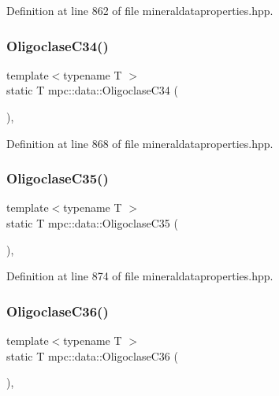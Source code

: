 Definition at line 862 of file mineraldataproperties.\+hpp.

\mbox{\label{namespacempc_1_1data_a425521c883ad46c92e6796d1252e7901}} 
\subsubsection{\texorpdfstring{Oligoclase\+C34()}{OligoclaseC34()}}
{\footnotesize\ttfamily template$<$typename T $>$ \\
static T mpc\+::data\+::\+Oligoclase\+C34 (\begin{DoxyParamCaption}{ }\end{DoxyParamCaption})\hspace{0.3cm}{\ttfamily [inline]}, {\ttfamily [static]}}



Definition at line 868 of file mineraldataproperties.\+hpp.

\mbox{\label{namespacempc_1_1data_a514b5667234620780080d8bacda7253e}} 
\subsubsection{\texorpdfstring{Oligoclase\+C35()}{OligoclaseC35()}}
{\footnotesize\ttfamily template$<$typename T $>$ \\
static T mpc\+::data\+::\+Oligoclase\+C35 (\begin{DoxyParamCaption}{ }\end{DoxyParamCaption})\hspace{0.3cm}{\ttfamily [inline]}, {\ttfamily [static]}}



Definition at line 874 of file mineraldataproperties.\+hpp.

\mbox{\label{namespacempc_1_1data_ab0fde1910dad027f1f22483aea8e2d25}} 
\subsubsection{\texorpdfstring{Oligoclase\+C36()}{OligoclaseC36()}}
{\footnotesize\ttfamily template$<$typename T $>$ \\
static T mpc\+::data\+::\+Oligoclase\+C36 (\begin{DoxyParamCaption}{ }\end{DoxyParamCaption})\hspace{0.3cm}{\ttfamily [inline]}, {\ttfamily [static]}}



